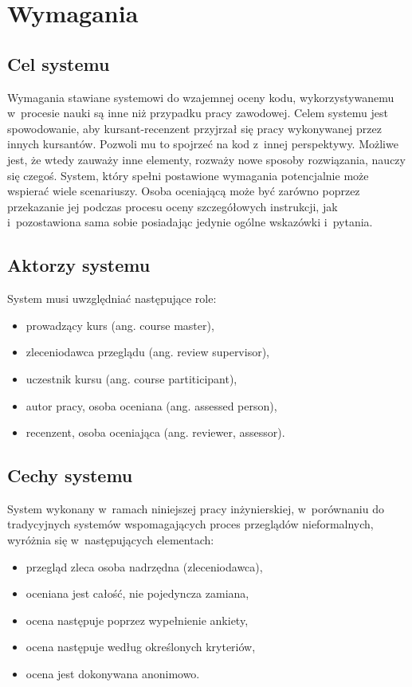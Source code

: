 \chapter{Wymagania}

\section{Cel systemu}

Wymagania stawiane systemowi do wzajemnej oceny kodu, wykorzystywanemu w~procesie nauki są inne niż przypadku pracy zawodowej. Celem systemu jest spowodowanie, aby kursant-recenzent przyjrzał się pracy wykonywanej przez innych kursantów. Pozwoli mu to spojrzeć na kod z~innej perspektywy. Możliwe jest, że wtedy zauważy inne elementy, rozważy nowe sposoby rozwiązania, nauczy się czegoś. System, który spełni postawione wymagania potencjalnie może wspierać wiele scenariuszy. Osoba oceniającą może być zarówno  poprzez przekazanie jej podczas procesu oceny szczegółowych instrukcji, jak i~pozostawiona sama sobie posiadając jedynie ogólne wskazówki i~pytania.

\section{Aktorzy systemu}
System musi uwzględniać następujące role:

\begin{itemize}
    \item prowadzący kurs (ang. course master),
    \item zleceniodawca przeglądu (ang. review supervisor),
    \item uczestnik kursu (ang. course partiticipant),
    \item autor pracy, osoba oceniana (ang. assessed person),
    \item recenzent, osoba oceniająca (ang. reviewer, assessor).
\end{itemize}

\section{Cechy systemu}
System wykonany w~ramach niniejszej pracy inżynierskiej, w~porównaniu do tradycyjnych systemów wspomagających proces przeglądów nieformalnych, wyróżnia się w~następujących elementach:

\begin{itemize}
    \item przegląd zleca osoba nadrzędna (zleceniodawca),
    \item oceniana jest całość, nie pojedyncza zamiana,
    \item ocena następuje poprzez wypełnienie ankiety,
    \item ocena następuje według określonych kryteriów,
    \item ocena jest dokonywana anonimowo.
\end{itemize}

